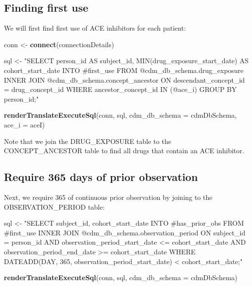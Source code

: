 \documentclass[11pt]{book}
\newenvironment{Shaded}{\begin{snugshade}}{\end{snugshade}}
\newcommand{\DataTypeTok}[1]{\textcolor[rgb]{0.13,0.29,0.53}{#1}}
\newcommand{\KeywordTok}[1]{\textcolor[rgb]{0.13,0.29,0.53}{\textbf{#1}}}
\newcommand{\NormalTok}[1]{#1}
\newcommand{\StringTok}[1]{\textcolor[rgb]{0.31,0.60,0.02}{#1}}
\theoremstyle{definition}
\theoremstyle{definition}
\theoremstyle{definition}
\theoremstyle{remark}
\begin{document}
\hypertarget{finding-first-use}{%
\subsection{Finding first use}\label{finding-first-use}}

We will first find first use of ACE inhibitors for each patient:

\begin{Shaded}
\begin{Highlighting}[]
\NormalTok{conn <-}\StringTok{ }\KeywordTok{connect}\NormalTok{(connectionDetails)}

\NormalTok{sql <-}\StringTok{ "SELECT person_id AS subject_id,}
\StringTok{  MIN(drug_exposure_start_date) AS cohort_start_date}
\StringTok{INTO #first_use}
\StringTok{FROM @cdm_db_schema.drug_exposure}
\StringTok{INNER JOIN @cdm_db_schema.concept_ancestor}
\StringTok{  ON descendant_concept_id = drug_concept_id}
\StringTok{WHERE ancestor_concept_id IN (@ace_i)}
\StringTok{GROUP BY person_id;"}

\KeywordTok{renderTranslateExecuteSql}\NormalTok{(conn, }
\NormalTok{                          sql, }
                          \DataTypeTok{cdm_db_schema =}\NormalTok{ cdmDbSchema, }
                          \DataTypeTok{ace_i =}\NormalTok{ aceI)}
\end{Highlighting}
\end{Shaded}

Note that we join the DRUG\_EXPOSURE table to the CONCEPT\_ANCESTOR table to find all drugs that contain an ACE inhibitor.

\hypertarget{require-365-days-of-prior-observation}{%
\subsection{Require 365 days of prior observation}\label{require-365-days-of-prior-observation}}

Next, we require 365 of continuous prior observation by joining to the OBSERVATION\_PERIOD table:

\begin{Shaded}
\begin{Highlighting}[]
\NormalTok{sql <-}\StringTok{ "SELECT subject_id,}
\StringTok{  cohort_start_date}
\StringTok{INTO #has_prior_obs}
\StringTok{FROM #first_use}
\StringTok{INNER JOIN @cdm_db_schema.observation_period}
\StringTok{  ON subject_id = person_id}
\StringTok{    AND observation_period_start_date <= cohort_start_date}
\StringTok{    AND observation_period_end_date >= cohort_start_date}
\StringTok{WHERE DATEADD(DAY, 365, observation_period_start_date) < cohort_start_date;"}

\KeywordTok{renderTranslateExecuteSql}\NormalTok{(conn, sql, }\DataTypeTok{cdm_db_schema =}\NormalTok{ cdmDbSchema)}
\end{Highlighting}
\end{Shaded}
\end{document}
